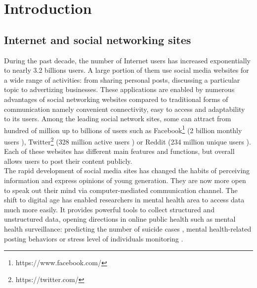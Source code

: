 
\chapter{Introduction}

\section{Internet and social networking sites}
During the past decade, the number of Internet users has increased exponentially to nearly 3.2 billions users. A large portion of them use social media websites for a wide range of activities: from sharing personal posts, discussing a particular topic to advertizing businesses. These applications are enabled by numerous advantages of social networking websites compared to traditional forms of communication namely convenient connectivity, easy to access and adaptability to its users. Among the leading social network sites, some can attract from hundred of million up to billions of users such as Facebook\footnote{https://www.facebook.com/} (2 billion monthly users \cite{Welch2017}), Twitter\footnote{https://twitter.com/} (328 million active users \cite{Aslam2017}) or Reddit\cite{https://www.reddit.com/} (234 million unique users \cite{Alexa2017}). Each of these websites has different main features and functions, but overall allows users to post their content publicly.\\
The rapid development of social media sites has changed the habits of perceiving information and express opinions of young generation. They are now more open to speak out their mind via computer-mediated communication channel. The shift to digital age has enabled researchers in mental health area to access data much more easily. It provides powerful tools to collect structured and unstructured data, opening directions in online public health such as mental health surveillance: predicting the number of suicide cases \cite{Won2013}, mental health-related posting behaviors \cite{Berry2017} or stress level of individuals monitoring \cite{Liu2017}. \\

